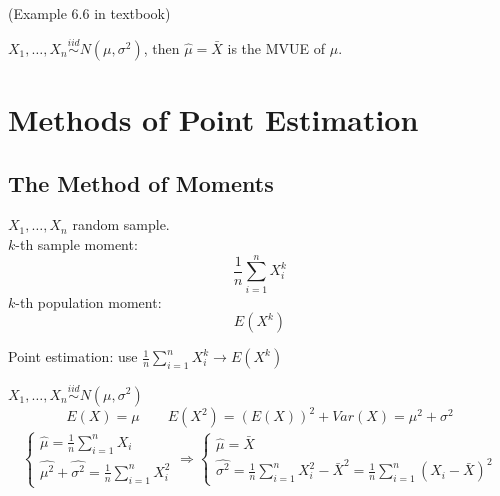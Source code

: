 \begin{exmp}
(Example 6.6 in textbook)

\end{exmp}

\begin{theo}
$X_1,\dots,X_n \overset{iid}{\sim} N(\mu,\sigma^2)$, then $\hat{\mu}=\bar{X}$ is the MVUE of $\mu$.
\end{theo}

\section{Methods of Point Estimation}
\subsection{The Method of Moments}
\begin{defn}
$X_1,\dots,X_n$ random sample. \\
$k$-th sample moment:
\[\frac{1}{n}\sum_{i=1}^n X_i^k\]
$k$-th population moment:
\[E(X^k)\]
\end{defn}

\begin{defn}
Point estimation: use $\frac{1}{n}\sum_{i=1}^n X_i^k \to E(X^k)$
\end{defn}

\begin{exmp}
$X_1,\dots,X_n \overset{iid}{\sim} N(\mu,\sigma^2)$
\[E(X)=\mu \qquad E(X^2)=(E(X))^2+Var(X)=\mu^2+\sigma^2\]
\begin{align*}       %
\left  \{              %
\begin{array}{ll}     %
\hat{\mu}=\frac{1}{n}\sum_{i=1}^n X_i \\    %
\hat{\mu^2}+\hat{\sigma^2}=\frac{1}{n}\sum_{i=1}^n X_i^2     %
\end{array}           %
\right.  \Rightarrow            %
\left  \{              %
\begin{array}{ll}     %
\hat{\mu}=\bar{X} \\    %
\hat{\sigma^2}=\frac{1}{n}\sum_{i=1}^n X_i^2 -\bar{X}^2=\frac{1}{n} \sum_{i=1}^n (X_i-\bar{X})^2   %
\end{array}           %
\right.
\end{align*}        %
\end{exmp}

